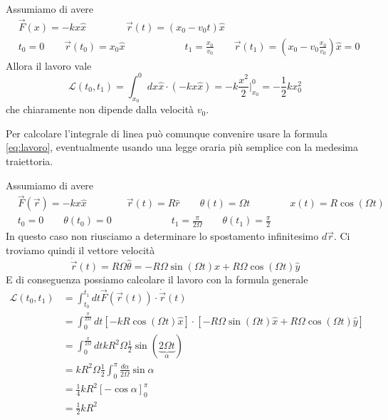 \begin{example}
	Assumiamo di avere
	\begin{equation*}
		\begin{split}
			& \vec{F}(x) = -kx\widehat{x} \qquad\qquad \vec{r}(t)=(x_0-v_0t)\widehat{x} \\
			& t_0 = 0 \qquad \vec{r}(t_0) = x_0 \widehat{x} \qquad\qquad\qquad t_1 = \frac{x_0}{v_0} \qquad \vec{r}(t_1) = (x_0 - v_0 \frac{x_0}{v_0})\widehat{x} = 0
		\end{split}
	\end{equation*}
	Allora il lavoro vale
	\begin{equation*}
		\mathcal{L}(t_0, t_1) = \int_{x_0}^{0} dx \widehat{x} \cdot (-kx\widehat{x}) = -k \frac{x^2}{2} \bigg\vert_{x_0}^0 = -\frac{1}{2}kx_0^2
	\end{equation*}
	che chiaramente non dipende dalla velocità $v_0$.
\end{example}
\begin{observation}
	Per calcolare l'integrale di linea può comunque convenire usare la formula \ref{eq:lavoro}, eventualmente usando una legge oraria più semplice con la medesima traiettoria.
\end{observation}

\newpage
\begin{example}
	Assumiamo di avere
	\begin{equation*}
		\begin{split}
			& \vec{F}(\vec{r}) = -kx\widehat{x} \qquad\qquad \vec{r}(t) = R\widehat{r} \qquad \theta(t) = \Omega t \qquad\qquad x(t) = R\cos(\Omega t) \\
			& t_0 = 0 \qquad \theta(t_0) = 0 \qquad\qquad\qquad t_1 = \frac{\pi}{2\Omega} \qquad \theta(t_1) = \frac{\pi}{2}
		\end{split}
	\end{equation*}
	In questo caso non riusciamo a determinare lo spostamento infinitesimo $d\vec{r}$. Ci troviamo quindi il vettore velocità
	\begin{equation*}
		\dot{\vec{r}}(t) = R\Omega \widehat{\theta} = -R\Omega \sin(\Omega t) \widehat{x} + R\Omega\cos(\Omega t) \widehat{y}
	\end{equation*}
	E di conseguenza possiamo calcolare il lavoro con la formula generale
	\begin{equation*}
		\begin{split}
			\mathcal{L}(t_0, t_1) & = \int_{t_0}^{t_1}dt \vec{F}(\vec{r}(t)) \cdot \dot{\vec{r}}(t) \\
			& = \int_{0}^{\frac{\pi}{2\Omega}} dt [-kR\cos(\Omega t)\widehat{x}] \cdot [-R\Omega\sin(\Omega t) \widehat{x} + R\Omega \cos(\Omega t) \widehat{y}] \\
			& = \int_{0}^{\frac{\pi}{2\Omega}}dt kR^2 \Omega \frac{1}{2}\sin(\underbrace{2\Omega t}_\alpha) \\
			& = kR^2 \Omega \frac{1}{2}\int_{0}^{\pi}\frac{d\alpha}{2\Omega}\sin\alpha \\
			& = \frac{1}{4}kR^2[-\cos\alpha]^\pi_0 \\
			& = \frac{1}{2}kR^2
		\end{split}
	\end{equation*}
\end{example}

